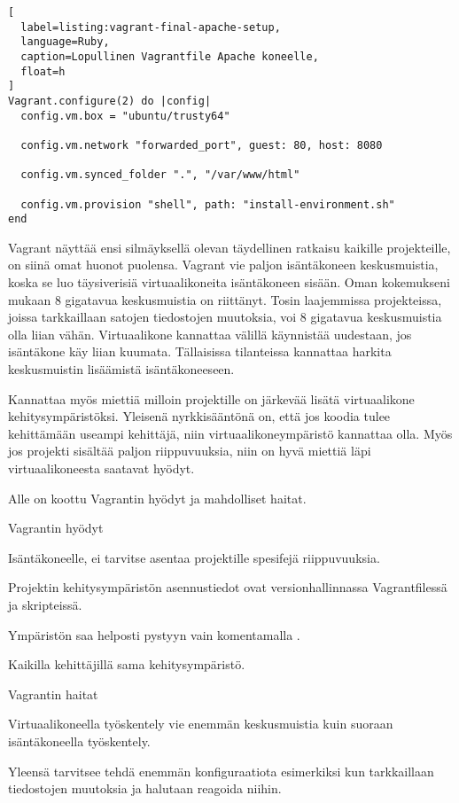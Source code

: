 \begin{lstlisting}[
  label=listing:vagrant-final-apache-setup,
  language=Ruby,
  caption=Lopullinen Vagrantfile Apache koneelle,
  float=h
]
Vagrant.configure(2) do |config|
  config.vm.box = "ubuntu/trusty64"

  config.vm.network "forwarded_port", guest: 80, host: 8080

  config.vm.synced_folder ".", "/var/www/html"

  config.vm.provision "shell", path: "install-environment.sh"
end
\end{lstlisting}


Vagrant näyttää ensi silmäyksellä olevan täydellinen ratkaisu kaikille projekteille, on siinä omat huonot puolensa. Vagrant vie paljon isäntäkoneen keskusmuistia, koska se luo täysiverisiä virtuaalikoneita isäntäkoneen sisään. Oman kokemukseni mukaan 8 gigatavua keskusmuistia on riittänyt. Tosin laajemmissa projekteissa, joissa tarkkaillaan satojen tiedostojen muutoksia, voi 8 gigatavua keskusmuistia olla liian vähän. Virtuaalikone kannattaa välillä käynnistää uudestaan, jos isäntäkone käy liian kuumata. Tällaisissa tilanteissa kannattaa harkita keskusmuistin lisäämistä isäntäkoneeseen.

Kannattaa myös miettiä milloin projektille on järkevää lisätä virtuaalikone kehitysympäristöksi. Yleisenä nyrkkisääntönä on, että jos koodia tulee kehittämään useampi kehittäjä, niin virtuaalikoneympäristö kannattaa olla. Myös jos projekti sisältää paljon riippuvuuksia, niin on hyvä miettiä läpi virtuaalikoneesta saatavat hyödyt.

Alle on koottu Vagrantin hyödyt ja mahdolliset haitat.

Vagrantin hyödyt
\begin{bullet-list}
  \item Isäntäkoneelle, ei tarvitse asentaa projektille spesifejä riippuvuuksia.
  \item Projektin kehitysympäristön asennustiedot ovat versionhallinnassa Vagrantfilessä ja skripteissä.
  \item Ympäristön saa helposti pystyyn vain komentamalla .
  \item Kaikilla kehittäjillä sama kehitysympäristö.
\end{bullet-list}

Vagrantin haitat
\begin{bullet-list}
  \item Virtuaalikoneella työskentely vie enemmän keskusmuistia kuin suoraan isäntäkoneella työskentely.
  \item Yleensä tarvitsee tehdä enemmän konfiguraatiota esimerkiksi kun tarkkaillaan tiedostojen muutoksia ja halutaan reagoida niihin.
\end{bullet-list}

